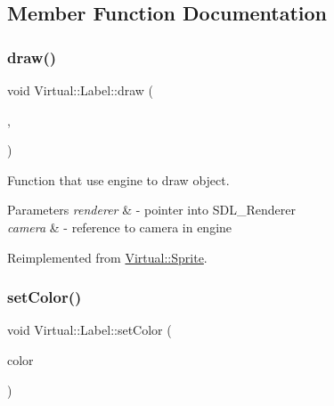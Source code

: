 \subsection{Member Function Documentation}
\hypertarget{class_virtual_1_1_label_a077d7852f09f940a9932f63fb616351c}{}\label{class_virtual_1_1_label_a077d7852f09f940a9932f63fb616351c} 
\subsubsection{\texorpdfstring{draw()}{draw()}}
{\footnotesize\ttfamily void Virtual\+::\+Label\+::draw (\begin{DoxyParamCaption}\item[{S\+D\+L\+\_\+\+Renderer $\ast$}]{,  }\item[{\hyperlink{class_virtual_1_1_camera}{Camera} \&}]{ }\end{DoxyParamCaption})\hspace{0.3cm}{\ttfamily [virtual]}}



Function that use engine to draw object. 


\begin{DoxyParams}{Parameters}
{\em renderer} & -\/ pointer into S\+D\+L\+\_\+\+Renderer \\
\hline
{\em camera} & -\/ reference to camera in engine \\
\hline
\end{DoxyParams}


Reimplemented from \hyperlink{class_virtual_1_1_sprite_a57f581e0307ab2b2dd7c6922dba2a057}{Virtual\+::\+Sprite}.

\hypertarget{class_virtual_1_1_label_adf4f738abab5dca3815a9c6f4124eec6}{}\label{class_virtual_1_1_label_adf4f738abab5dca3815a9c6f4124eec6} 
\subsubsection{\texorpdfstring{set\+Color()}{setColor()}}
{\footnotesize\ttfamily void Virtual\+::\+Label\+::set\+Color (\begin{DoxyParamCaption}\item[{\hyperlink{struct_virtual_1_1_color}{Color}}]{color }\end{DoxyParamCaption})}



